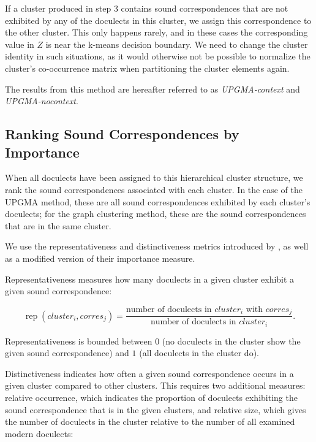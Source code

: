 \documentclass[a4paper]{article}
\begin{document}
If a cluster produced in step 3 contains
sound correspondences that are not exhibited
by any of the doculects in this cluster,
we assign this correspondence to the other cluster.
This only happens rarely, and in these cases the corresponding
value in $Z$ is near the k-means decision boundary.
We need to change the cluster identity in such situations,
as it would otherwise not be possible to normalize
the cluster's co-occurrence matrix when partitioning
the cluster elements again.

The results from this method are hereafter referred to
as \textit{UPGMA-context} and \textit{UPGMA-nocontext}.

\subsection{Ranking Sound Correspondences by Importance}
\label{subsec:ranking}

When all doculects have been assigned to this hierarchical cluster structure,
we rank the sound correspondences associated with each cluster.
In the case of the UPGMA method, these are
all sound correspondences exhibited by each cluster's doculects;
for the graph clustering method,
these are the sound correspondences that are in the same cluster.

We use the representativeness and distinctiveness metrics
introduced by \citet{wieling2011bipartite},
as well as a modified version of their importance measure.

Representativeness measures how many doculects in a given cluster
exhibit a given sound correspondence:

\begin{equation*}
\operatorname{rep}(cluster_i, corres_j) = 
\frac{\text{number of doculects in } cluster_i \text{ with }  corres_j}
{\text{number of doculects in }  cluster_i}
.
\end{equation*}

Representativeness is bounded between
$0$ (no doculects in the cluster show the given sound correspondence)
and $1$ (all doculects in the cluster do).

Distinctiveness indicates how often a given sound correspondence
occurs in a given cluster compared to other clusters. 
This requires two additional measures:
relative occurrence, which indicates the proportion
of doculects exhibiting the sound correspondence
that is in the given clusters,
and relative size, which gives the number of doculects 
in the cluster relative to the number of all examined modern doculects:
\end{document}

